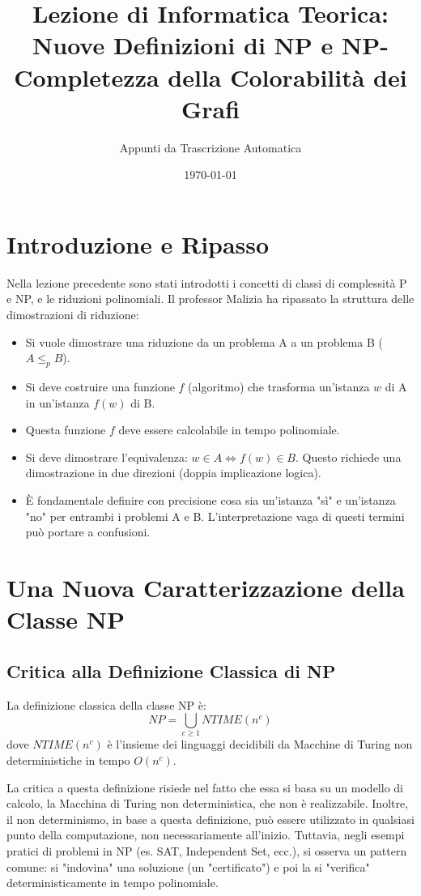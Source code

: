 \documentclass[a4paper]{article}
\title{Lezione di Informatica Teorica: Nuove Definizioni di NP e NP-Completezza della Colorabilità dei Grafi}
\author{Appunti da Trascrizione Automatica}
\date{\today}
\theoremstyle{definition} %
\begin{document}
\maketitle
\tableofcontents
\newpage

\section{Introduzione e Ripasso}
Nella lezione precedente sono stati introdotti i concetti di classi di complessità P e NP, e le riduzioni polinomiali.
Il professor Malizia ha ripassato la struttura delle dimostrazioni di riduzione:
\begin{itemize}
    \item Si vuole dimostrare una riduzione da un problema A a un problema B ($A \le_p B$).
    \item Si deve costruire una funzione $f$ (algoritmo) che trasforma un'istanza $w$ di A in un'istanza $f(w)$ di B.
    \item Questa funzione $f$ deve essere calcolabile in tempo polinomiale.
    \item Si deve dimostrare l'equivalenza: $w \in A \iff f(w) \in B$. Questo richiede una dimostrazione in due direzioni (doppia implicazione logica).
    \item È fondamentale definire con precisione cosa sia un'istanza "sì" e un'istanza "no" per entrambi i problemi A e B. L'interpretazione vaga di questi termini può portare a confusioni.
\end{itemize}

\section{Una Nuova Caratterizzazione della Classe NP}

\subsection{Critica alla Definizione Classica di NP}
La definizione classica della classe NP è:
\[ NP = \bigcup_{c \ge 1} NTIME(n^c) \]
dove $NTIME(n^c)$ è l'insieme dei linguaggi decidibili da Macchine di Turing non deterministiche in tempo $O(n^c)$.

La critica a questa definizione risiede nel fatto che essa si basa su un modello di calcolo, la Macchina di Turing non deterministica, che non è realizzabile. Inoltre, il non determinismo, in base a questa definizione, può essere utilizzato in qualsiasi punto della computazione, non necessariamente all'inizio. Tuttavia, negli esempi pratici di problemi in NP (es. SAT, Independent Set, ecc.), si osserva un pattern comune: si "indovina" una soluzione (un "certificato") e poi la si "verifica" deterministicamente in tempo polinomiale.
\end{document}
